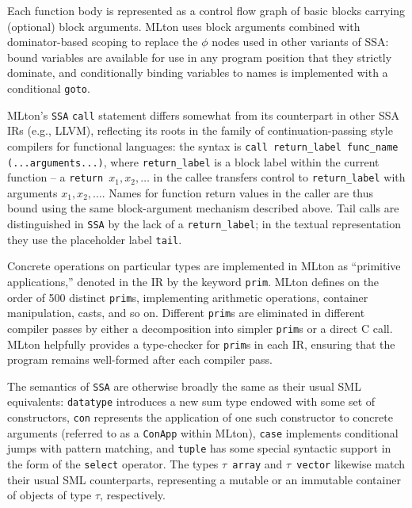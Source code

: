 Each function body is represented as a control flow graph of basic blocks
carrying (optional) block arguments. MLton uses block arguments combined with
dominator-based scoping to replace the $\phi$ nodes used in other variants of
SSA: bound variables are available for use in any program position that they
strictly dominate, and conditionally binding variables to names is implemented
with a conditional \texttt{goto}.

MLton's \texttt{SSA} \texttt{call} statement differs somewhat from its
counterpart in other SSA IRs (e.g., LLVM), reflecting its roots in the family of
continuation-passing style compilers for functional languages: the syntax is
\texttt{call return\_label func\_name (...arguments...)}, where
\texttt{return\_label} is a block label within the current function -- a
\texttt{return $x_1, x_2, \dots$} in the callee transfers control to
\texttt{return\_label} with arguments $x_1, x_2, \dots$. Names for function
return values in the caller are thus bound using the same block-argument
mechanism described above. Tail calls are distinguished in \texttt{SSA} by the
lack of a \texttt{return\_label}; in the textual representation they use the
placeholder label \texttt{tail}.

Concrete operations on particular types are implemented in MLton as ``primitive
applications,'' denoted in the IR by the keyword \texttt{prim}. MLton defines on
the order of 500 distinct \texttt{prim}s, implementing arithmetic operations,
container manipulation, casts, and so on. Different \texttt{prim}s are
eliminated in different compiler passes by either a decomposition into simpler
\texttt{prim}s or a direct C call. MLton helpfully provides a type-checker for
\texttt{prim}s in each IR, ensuring that the program remains well-formed after
each compiler pass.

The semantics of \texttt{SSA} are otherwise broadly the same as their usual SML
equivalents: \texttt{datatype} introduces a new sum type endowed with some set
of constructors, \texttt{con} represents the application of one such constructor
to concrete arguments (referred to as a \texttt{ConApp} within MLton),
\texttt{case} implements conditional jumps with pattern matching, and
\texttt{tuple} has some special syntactic support in the form of the
\texttt{select} operator. The types \texttt{$\tau$ array} and \texttt{$\tau$ vector}
likewise match their usual SML counterparts, representing a mutable or an
immutable container of objects of type \texttt{$\tau$}, respectively.

